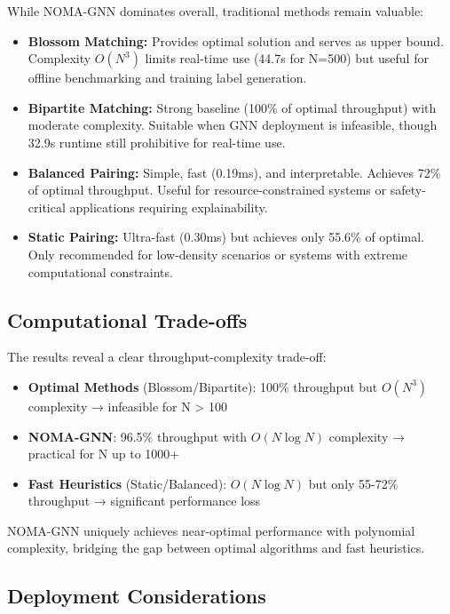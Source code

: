 While NOMA-GNN dominates overall, traditional methods remain valuable:

\begin{itemize}
    \item \textbf{Blossom Matching:} Provides optimal solution and serves as upper bound. Complexity $O(N^3)$ limits real-time use (44.7s for N=500) but useful for offline benchmarking and training label generation.
    
    \item \textbf{Bipartite Matching:} Strong baseline (100\% of optimal throughput) with moderate complexity. Suitable when GNN deployment is infeasible, though 32.9s runtime still prohibitive for real-time use.
    
    \item \textbf{Balanced Pairing:} Simple, fast (0.19ms), and interpretable. Achieves 72\% of optimal throughput. Useful for resource-constrained systems or safety-critical applications requiring explainability.
    
    \item \textbf{Static Pairing:} Ultra-fast (0.30ms) but achieves only 55.6\% of optimal. Only recommended for low-density scenarios or systems with extreme computational constraints.
\end{itemize}

\subsection{Computational Trade-offs}

The results reveal a clear throughput-complexity trade-off:

\begin{itemize}
    \item \textbf{Optimal Methods} (Blossom/Bipartite): 100\% throughput but $O(N^3)$ complexity → infeasible for N > 100
    \item \textbf{NOMA-GNN}: 96.5\% throughput with $O(N \log N)$ complexity → practical for N up to 1000+
    \item \textbf{Fast Heuristics} (Static/Balanced): $O(N \log N)$ but only 55-72\% throughput → significant performance loss
\end{itemize}

NOMA-GNN uniquely achieves near-optimal performance with polynomial complexity, bridging the gap between optimal algorithms and fast heuristics.

\subsection{Deployment Considerations}

